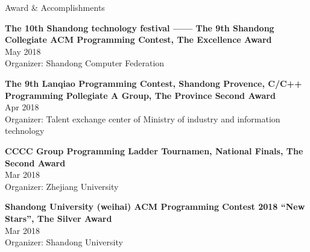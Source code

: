 \documentclass{resume} %
\begin{document}
\begin{rSection}{Award \& Accomplish­ments}
 
{\bf The 10th Shandong technology festival —— The 9th Shandong Collegiate ACM Programming Contest, The Excellence Award}\\ \hfill {May 2018}\\
{Organizer: Shandong Computer Federation}

{\bf The 9th Lanqiao Programming Contest, Shandong Provence, C/C++ Programming Pollegiate A Group, The Province Second Award}\\ \hfill {Apr 2018}\\
{Organizer: Talent exchange center of Ministry of industry and information technology}

{\bf CCCC Group Programming Ladder Tournamen, National Finals, The Second Award}\\ \hfill {Mar 2018}\\
{Organizer: Zhejiang University}

{\bf Shandong University (weihai) ACM Programming Contest 2018 “New Stars”, The Silver Award}\\ \hfill {Mar 2018}\\
{Organizer: Shandong University}

\end{rSection}




\end{document}
